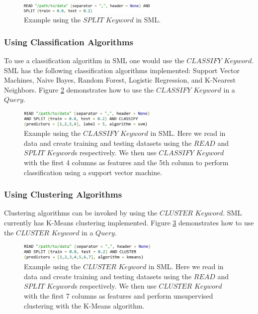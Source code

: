 \documentclass[jair,twoside,11pt,theapa]{article}
\begin{document}
\begin{figure}
\includegraphics[width=0.6\textwidth]{figs/SPLIT.png}
\centering
\caption{Example using the \(SPLIT\) \(Keyword\) in SML.}
\label{fig:SML:SPLIT}
\end{figure}

\subsubsection{Using Classification Algorithms}
To use a classification algorithm in SML one would use the \(CLASSIFY\) \(Keyword\). SML has the following classification algorithms implemented: Support Vector Machines, Naive Bayes, Random Forest, Logistic Regression, and K-Nearest Neighbors. Figure \ref{fig:SML:CLASSIFY} demonstrates how to use the \(CLASSIFY\) \(Keyword\) in a \(Query\). 

\begin{figure}
\includegraphics[width=0.6\textwidth]{figs/CLASSIFY.png}
\centering
\caption{Example using the \(CLASSIFY\) \(Keyword\) in SML. Here we read in data and create training and testing datasets using the \(READ\) and \(SPLIT\) \(Keyword\)s respectively. We then use \(CLASSIFY\) \(Keyword\) with the first 4 columns as features and the 5th column to perform classification using a support vector machine.}
\label{fig:SML:CLASSIFY}
\end{figure}

\subsubsection{Using Clustering Algorithms}
Clustering algorithms can be invoked by using the \(CLUSTER\) \(Keyword\). SML currently has K-Means clustering implemented. Figure \ref{fig:SML:CLUSTER} demonstrates how to use the \(CLUSTER\) \(Keyword\) in a \(Query\).

\begin{figure}
\includegraphics[width=0.6\textwidth]{figs/CLUSTER.png}
\centering
\caption{Example using the \(CLUSTER\) \(Keyword\) in SML. Here we read in data and create training and testing datasets using the \(READ\) and \(SPLIT\) \(Keyword\)s respectively. We then use \(CLUSTER\) \(Keyword\) with the first 7 columns as features and perform unsupervised clustering with the K-Means algorithm.}
\label{fig:SML:CLUSTER}
\end{figure}
\end{document}

